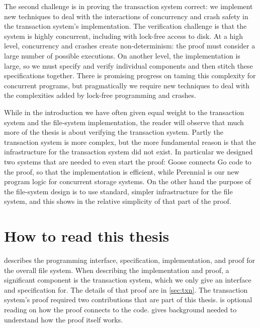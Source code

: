 The second challenge is in proving the transaction system correct: we implement
new techniques to deal with the interactions of concurrency and crash safety in
the transaction system's implementation. The verification challenge is that the
system is highly concurrent, including with lock-free access to disk. At a high
level, concurrency and crashes create non-determinism: the proof must consider a
large number of possible executions. On another level, the implementation is
large, so we must specify and verify individual components and then stitch these
specifications together. There is promising progress on taming this complexity
for concurrent programs, but pragmatically we require new techniques to deal
with the complexities added by lock-free programming and crashes.

While in the introduction we have often given equal weight to the transaction
system and the file-system implementation, the reader will observe that much
more of the thesis is about verifying the transaction system. Partly the
transaction system is more complex, but the more fundamental reason is that the
infrastructure for the transaction system did not exist. In particular we
designed two systems that are needed to even start the proof: Goose connects Go
code to the proof, so that the implementation is efficient, while Perennial is
our new program logic for concurrent storage systems. On the other hand the
purpose of the file-system design is to use standard, simpler infrastructure for
the file system, and this shows in the relative simplicity of that part of the
proof.

\section{How to read this thesis}

 describes the programming interface, specification,
implementation, and proof for the overall file system. When describing the
implementation and proof, a significant component is the transaction system,
which we only give an interface and specification for. The details of that proof
are in \cref{sec:txn}. The transaction system's proof required two
contributions that are part of this thesis.  is optional
reading on how the proof connects to the code.  gives
background needed to understand how the proof itself works.
